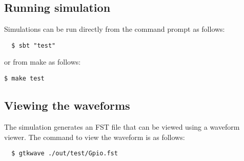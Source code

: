 \subsection{Running simulation}

Simulations can be run directly from the command prompt as follows:

\begin{verbatim}
  $ sbt "test"
\end{verbatim}

or from make as follows:

\texttt{\$ make test}

\subsection{Viewing the waveforms}

The simulation generates an FST file that can be viewed using a waveform viewer. The command to view the waveform is as follows:
\begin{verbatim}
  $ gtkwave ./out/test/Gpio.fst
\end{verbatim}
